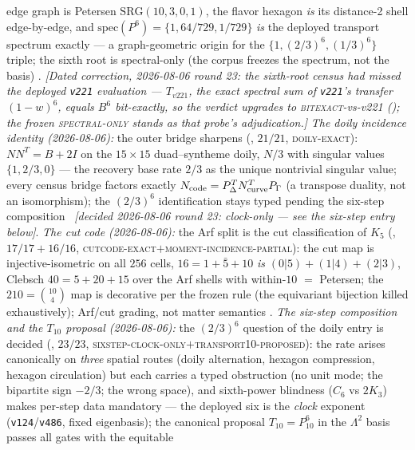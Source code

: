 edge graph is Petersen $\mathrm{SRG}(10,3,0,1)$, the flavor
hexagon \emph{is} its distance-2 shell edge-by-edge, and
$\mathrm{spec}(P^6)=\{1,64/729,1/729\}$ \emph{is} the deployed
transport spectrum exactly --- a graph-geometric origin for the
$\{1,(2/3)^6,(1/3)^6\}$ triple; the sixth root is spectral-only
(the corpus freezes the spectrum, not the basis) \mE.
\emph{[Dated correction, 2026-08-06 round 23: the sixth-root
census had missed the deployed \texttt{v221} evaluation ---
$T_{v221}$, the exact spectral sum of \texttt{v221}'s transfer
$(1-w)^6$, equals $B^6$ \emph{bit-exactly}, so the verdict
upgrades to \textsc{bitexact}-vs-v221
(); the frozen
\textsc{spectral-only} stands as that probe's adjudication.]}
\emph{The doily incidence identity (2026-08-06):} the outer
bridge sharpens
(, $21/21$,
\textsc{doily-exact}): $NN^{T}=B+2I$ on the $15\times15$
duad--syntheme doily, $N/3$ with singular values $\{1,2/3,0\}$ ---
the recovery base rate $2/3$ as the unique nontrivial singular
value; every census bridge factors exactly
$N_{\rm code}=P_\Delta^{T}N_{\rm curve}^{T}P_\Gamma$ (a transpose
duality, not an isomorphism); the $(2/3)^6$ identification stays
typed pending the six-step composition \mE\ \emph{[decided
2026-08-06 round 23: clock-only --- see the six-step entry
below]}.
\emph{The cut code (2026-08-06):} the Arf split is the cut
classification of $K_5$
(, $17/17+16/16$,
\textsc{cutcode-exact}$+$\textsc{moment-incidence-partial}): the
cut map is injective-isometric on all $256$ cells,
$16=1+\bar5+10$ \emph{is} $(0|5)+(1|4)+(2|3)$, Clebsch
$40=5+20+15$ over the Arf shells with within-$10$ $=$ Petersen;
the $210=\binom{10}{4}$ map is decorative per the frozen rule
(the equivariant bijection killed exhaustively); Arf/cut grading,
not matter semantics \mE.
\emph{The six-step composition and the $T_{10}$ proposal
(2026-08-06):} the $(2/3)^6$ question of the doily entry is
decided
(, $23/23$,
\textsc{sixstep-clock-only}$+$\textsc{transport10-proposed}): the
rate arises canonically on \emph{three} spatial routes (doily
alternation, hexagon compression, hexagon circulation) but each
carries a typed obstruction (no unit mode; the bipartite sign
$-2/3$; the wrong space), and sixth-power blindness ($C_6$ vs
$2K_3$) makes per-step data mandatory --- the deployed six is the
\emph{clock} exponent (\texttt{v124}/\texttt{v486}, fixed
eigenbasis); the canonical proposal $T_{10}=P_{10}^6$ in the
$\Lambda^2$ basis passes all gates with the equitable
